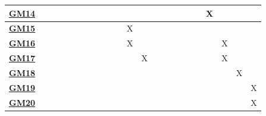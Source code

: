 \documentclass[12pt, titlepage]{article}
\begin{document}
\begin{table}[H]
\begin{adjustwidth}{-1.57in}{-1in}
{\begin{tabular}{c|c|c|c|c|c|c|c|c|c|c|c|c|c|c|c|c|c|c|c|c|c|c|}
\multicolumn{1}{|c|}{\hyperref[Test-GM14]{\textbf{GM14}}} &              &              &              &              &              &              &              &              &              &              &              &              &              &              &             &            &             &           &X & & &   \\ \hline
\multicolumn{1}{|c|}{\hyperref[Test-GM15]{\textbf{GM15}}} &              &              &              &              &              &              &              &              &              &              &   X           &              &              &              &             &             &             &          & & & &    \\ \hline
\multicolumn{1}{|c|}{\hyperref[Test-GM16]{\textbf{GM16}}} &              &              &              &              &              &              &              &              &              &              &    X          &              &              &              &             &             &             &          & &X & &    \\ \hline
\multicolumn{1}{|c|}{\hyperref[Test-GM17]{\textbf{GM17}}} &              &              &              &              &              &             &              &              &              &              &              &     X         &              &              &             &             &             &           & &X & &   \\ \hline
\multicolumn{1}{|c|}{\hyperref[Test-GM18]{\textbf{GM18}}} &              &              &              &              &              &              &              &              &              &              &              &              &              &              &             &             &             &           & & & X&   \\ \hline
\multicolumn{1}{|c|}{\hyperref[Test-GM19]{\textbf{GM19}}} &              &              &              &              &              &              &              &              &              &              &              &              &              &              &             &             &             &           & & & & X  \\ \hline
\multicolumn{1}{|c|}{\hyperref[Test-GM20]{\textbf{GM20}}} &              &              &              &              &              &              &              &              &              &              &              &              &              &              &             &             &             &           & & & & X  \\ \hline

\end{tabular}}
\end{adjustwidth}
\end{table}
\end{document}
